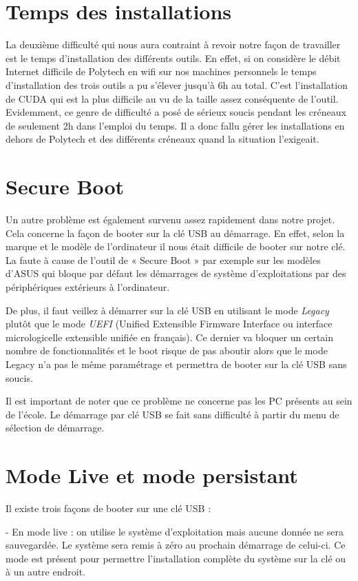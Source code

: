 \documentclass[final]{polytech/polytech}
\begin{document}
\section{Temps des installations}
La deuxième difficulté qui nous aura contraint à revoir notre façon de travailler est le temps d’installation des différents outils. En effet, si on considère le débit Internet difficile de Polytech en wifi sur nos machines personnels le temps d’installation des trois outils a pu s’élever jusqu’à 6h au total. C’est l’installation de CUDA qui est la plus difficile au vu de la taille assez conséquente de l’outil. Evidemment, ce genre de difficulté a posé de sérieux soucis pendant les créneaux de seulement 2h dans l’emploi du temps. Il a donc fallu gérer les installations en dehors de Polytech et des différents créneaux quand la situation l’exigeait.

\section{Secure Boot}
Un autre problème est également survenu assez rapidement dans notre projet. Cela concerne la façon de booter sur la clé USB au démarrage. En effet, selon la marque et le modèle de l’ordinateur il nous était difficile de booter sur notre clé. La faute à cause de l’outil de « Secure Boot » par exemple sur les modèles d’ASUS qui bloque par défaut les démarrages de système d’exploitations par des périphériques extérieurs à l’ordinateur.

De plus, il faut veillez à démarrer sur la clé USB en utilisant le mode \textit{Legacy} plutôt que le mode \textit{UEFI} (Unified Extensible Firmware Interface ou interface micrologicelle extensible unifiée en français). Ce dernier va bloquer un certain nombre de fonctionnalités et le boot risque de pas aboutir alors que le mode Legacy n'a pas le même paramétrage et permettra de booter sur la clé USB sans soucis.

Il est important de noter que ce problème ne concerne pas les PC présents au sein de l’école. Le démarrage par clé USB se fait sans difficulté à partir du menu de sélection de démarrage.

\section{Mode Live et mode persistant}
Il existe trois façons de booter sur une clé USB :

- En mode live : on utilise le système d’exploitation mais aucune donnée ne sera sauvegardée. Le système sera remis à zéro au prochain démarrage de celui-ci. Ce mode est présent pour permettre l’installation complète du système sur la clé ou à un autre endroit.
\end{document}

